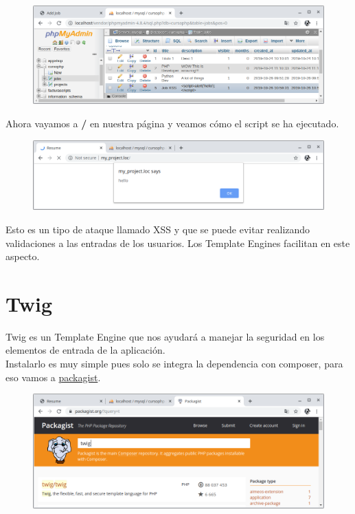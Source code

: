 \documentclass{article}
\begin{document}
\begin{figure}[h!]
  \centering
  \includegraphics[scale=0.5]{./Pictures/151_ataque_XSS.png}
\end{figure}

Ahora vayamos a \textbf{/} en nuestra página y veamos cómo el script se ha
ejecutado.\\

\begin{figure}[h!]
  \centering
  \includegraphics[scale=0.5]{./Pictures/152_ataque_XSS.png}
\end{figure}

Esto es un tipo de ataque llamado XSS y que se puede evitar realizando
validaciones a las entradas de los usuarios. Los Template Engines facilitan en
este aspecto.\\

\newpage


\section{Twig}%
Twig es un Template Engine que nos ayudará a manejar la seguridad en los
elementos de entrada de la aplicación.\\

Instalarlo es muy simple pues solo se integra la dependencia con composer, para
eso vamos a \href{https://packagist.org/}{packagist}.\\

\begin{figure}[h!]
  \centering
  \includegraphics[scale=0.5]{./Pictures/153_packagist_twig.png}
\end{figure}
\end{document}
